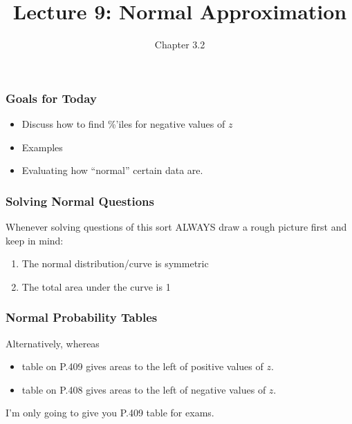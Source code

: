 \documentclass[handout]{beamer}
\title{Lecture 9: Normal Approximation}
\author{Chapter 3.2}
\date{}
\newcommand{\blue}[1]{\textcolor{blue2}{#1}}
\begin{document}
\begin{frame}
\titlepage
\end{frame}


\begin{frame}[fragile]
\frametitle{Goals for Today}

\begin{itemize}
\item Discuss how to find \%'iles for negative values of $z$
\item Examples
\item Evaluating how ``normal'' certain data are.  
\end{itemize}

\end{frame}


\begin{frame}
\frametitle{Solving Normal Questions}
Whenever solving questions of this sort \blue{ALWAYS} draw a rough picture first and keep in mind:
\begin{enumerate}
\item The normal distribution/curve is \blue{symmetric}
\item The total area under the curve is 1
\end{enumerate}

\end{frame}


\begin{frame}
\frametitle{Normal Probability Tables}
Alternatively, whereas 
\begin{itemize}
\item table on P.409 gives areas to the left of positive values of $z$.
\item table on P.408 gives areas to the left of negative values of $z$.
\end{itemize}

\vspace{0.5cm}
I'm only going to give you P.409 table for exams.

\end{frame}
\end{document}
